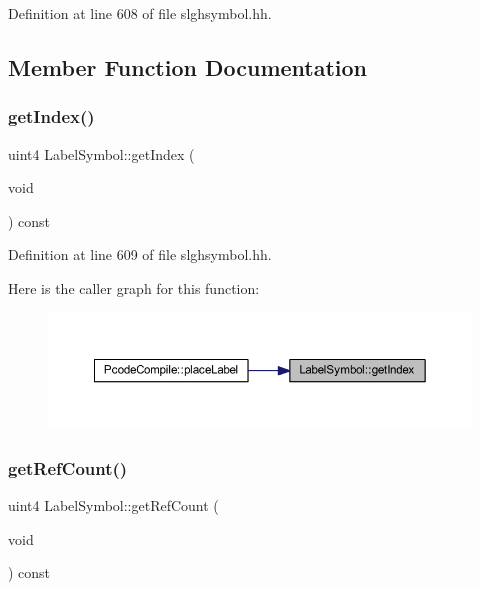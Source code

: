 Definition at line 608 of file slghsymbol.\+hh.



\subsection{Member Function Documentation}
\mbox{\label{class_label_symbol_afd1c15a0468bfa3bfa0ae7ab018edfd6}} 
\subsubsection{\texorpdfstring{getIndex()}{getIndex()}}
{\footnotesize\ttfamily uint4 Label\+Symbol\+::get\+Index (\begin{DoxyParamCaption}\item[{void}]{ }\end{DoxyParamCaption}) const\hspace{0.3cm}{\ttfamily [inline]}}



Definition at line 609 of file slghsymbol.\+hh.

Here is the caller graph for this function\+:
\nopagebreak
\begin{figure}[H]
\begin{center}
\leavevmode
\includegraphics[width=350pt]{class_label_symbol_afd1c15a0468bfa3bfa0ae7ab018edfd6_icgraph}
\end{center}
\end{figure}
\mbox{\label{class_label_symbol_a2a62ef1da181d35ab9785a493a242a23}} 
\subsubsection{\texorpdfstring{getRefCount()}{getRefCount()}}
{\footnotesize\ttfamily uint4 Label\+Symbol\+::get\+Ref\+Count (\begin{DoxyParamCaption}\item[{void}]{ }\end{DoxyParamCaption}) const\hspace{0.3cm}{\ttfamily [inline]}}




